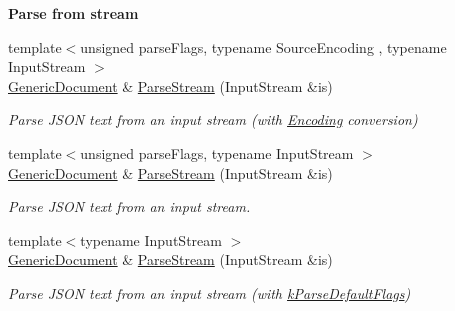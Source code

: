 \begin{Indent}\textbf{ Parse from stream}\par
\begin{DoxyCompactItemize}
\item 
{\footnotesize template$<$unsigned parse\+Flags, typename Source\+Encoding , typename Input\+Stream $>$ }\\\mbox{\hyperlink{classrapidjson_1_1_generic_document}{Generic\+Document}} \& \mbox{\hyperlink{classrapidjson_1_1_generic_document_a3ae97682cf04685c7db9d89ebc399b85}{Parse\+Stream}} (Input\+Stream \&is)
\begin{DoxyCompactList}\small\item\em Parse J\+S\+ON text from an input stream (with \mbox{\hyperlink{classrapidjson_1_1_encoding}{Encoding}} conversion) \end{DoxyCompactList}\item 
{\footnotesize template$<$unsigned parse\+Flags, typename Input\+Stream $>$ }\\\mbox{\hyperlink{classrapidjson_1_1_generic_document}{Generic\+Document}} \& \mbox{\hyperlink{classrapidjson_1_1_generic_document_ae4ee7d86b8c906c83dbe15e57eb6ac6a}{Parse\+Stream}} (Input\+Stream \&is)
\begin{DoxyCompactList}\small\item\em Parse J\+S\+ON text from an input stream. \end{DoxyCompactList}\item 
{\footnotesize template$<$typename Input\+Stream $>$ }\\\mbox{\hyperlink{classrapidjson_1_1_generic_document}{Generic\+Document}} \& \mbox{\hyperlink{classrapidjson_1_1_generic_document_acf96a3c7fd61486d049c701b1fe5d414}{Parse\+Stream}} (Input\+Stream \&is)
\begin{DoxyCompactList}\small\item\em Parse J\+S\+ON text from an input stream (with \mbox{\hyperlink{namespacerapidjson_a81379eb4e94a0386d71d15fda882ebc9a5640cb00db7814b7f22be3683dda9835}{k\+Parse\+Default\+Flags}}) \end{DoxyCompactList}\end{DoxyCompactItemize}
\end{Indent}
